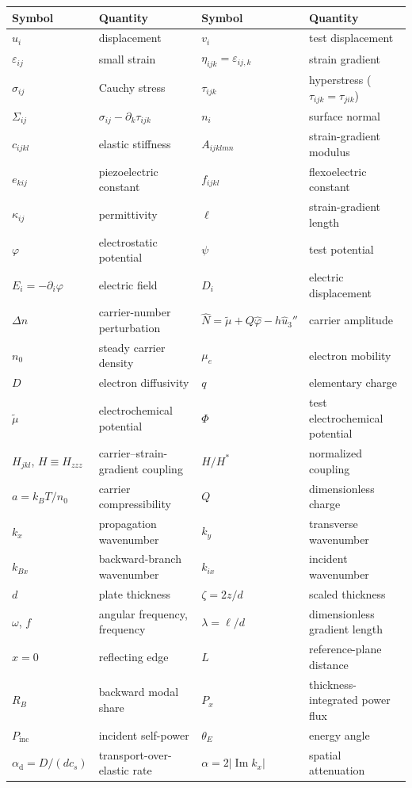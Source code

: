 \documentclass[12pt,a4paper]{article}
\DeclareMathOperator{\Imag}{Im}
\begin{document}
\begin{center}
\footnotesize
\begin{tabular}{@{}ll@{\qquad}ll@{}}
\toprule
Symbol & Quantity & Symbol & Quantity \\
\midrule
$u_i$ & displacement & $v_i$ & test displacement \\
$\varepsilon_{ij}$ & small strain & $\eta_{ijk}=\varepsilon_{ij,k}$ & strain gradient \\
$\sigma_{ij}$ & Cauchy stress & $\tau_{ijk}$ & hyperstress ($\tau_{ijk}=\tau_{jik}$) \\
$\Sigma_{ij}$ & $\sigma_{ij}-\partial_k\tau_{ijk}$ & $n_i$ & surface normal \\
$c_{ijkl}$ & elastic stiffness & $A_{ijklmn}$ & strain-gradient modulus \\
$e_{kij}$ & piezoelectric constant & $f_{ijkl}$ & flexoelectric constant \\
$\kappa_{ij}$ & permittivity & $\ell$ & strain-gradient length \\
$\varphi$ & electrostatic potential & $\psi$ & test potential \\
$E_i=-\partial_i\varphi$ & electric field & $D_i$ & electric displacement \\
$\Delta n$ & carrier-number perturbation & $\widehat N=\widetilde\mu+Q\widehat\varphi-h\widehat u_3''$ & carrier amplitude \\
$n_0$ & steady carrier density & $\mu_e$ & electron mobility \\
$D$ & electron diffusivity & $q$ & elementary charge \\
$\widetilde\mu$ & electrochemical potential & $\Phi$ & test electrochemical potential \\
$H_{jkl}$, $H\equiv H_{zzz}$ & carrier--strain-gradient coupling & $H/H^{*}$ & normalized coupling \\
$a=k_BT/n_0$ & carrier compressibility & $Q$ & dimensionless charge \\
$k_x$ & propagation wavenumber & $k_y$ & transverse wavenumber \\
$k_{Bx}$ & backward-branch wavenumber & $k_{ix}$ & incident wavenumber \\
$d$ & plate thickness & $\zeta=2z/d$ & scaled thickness \\
$\omega$, $f$ & angular frequency, frequency & $\lambda=\ell/d$ & dimensionless gradient length \\
$x=0$ & reflecting edge & $L$ & reference-plane distance \\
$R_B$ & backward modal share & $P_x$ & thickness-integrated power flux \\
$P_{\text{inc}}$ & incident self-power & $\theta_E$ & energy angle \\
$\alpha_{\mathrm d}=D/(dc_s)$ & transport-over-elastic rate & $\alpha=2|\Imag k_x|$ & spatial attenuation \\
\bottomrule
\end{tabular}
\end{center}
\end{document}
